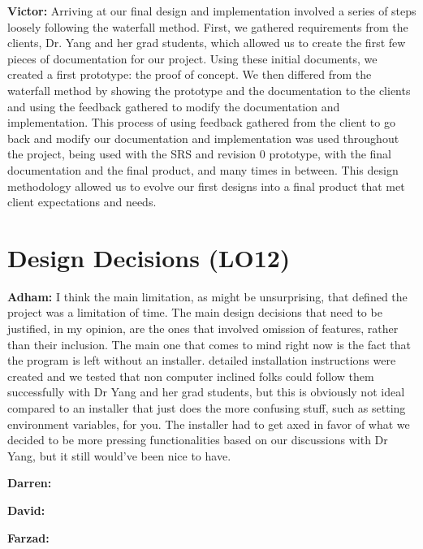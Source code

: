 \documentclass{article}
\begin{document}
\textbf{Victor:} Arriving at our final design and implementation involved a series of steps loosely following the waterfall method. First, we gathered requirements from the 
clients, Dr. Yang and her grad students, which allowed us to create the first few pieces of documentation for our project. Using these initial documents, we created a first 
prototype: the proof of concept. We then differed from the waterfall method by showing the prototype and the documentation to the clients and using the feedback gathered to 
modify the documentation and implementation. This process of using feedback gathered from the client to go back and modify our documentation and implementation was used 
throughout the project, being used with the SRS and revision 0 prototype, with the final documentation and the final product, and many times in between. This design methodology 
allowed us to evolve our first designs into a final product that met client expectations and needs.

\section{Design Decisions (LO12)}


\textbf{Adham:} I think the main limitation, as might be unsurprising, that defined the project was a limitation of time. The main design decisions that need to be justified, in
my opinion, are the ones that involved omission of features, rather than their inclusion. The main one that comes to mind right now is the fact that the program is left without
an installer. detailed installation instructions were created and we tested that non computer inclined folks could follow them successfully with Dr Yang and her grad students,
but this is obviously not ideal compared to an installer that just does the more confusing stuff, such as setting environment variables, for you. The installer had to get axed
in favor of what we decided to be more pressing functionalities based on our discussions with Dr Yang, but it still would've been nice to have.

\textbf{Darren:}

\textbf{David:}

\textbf{Farzad:}
\end{document}
